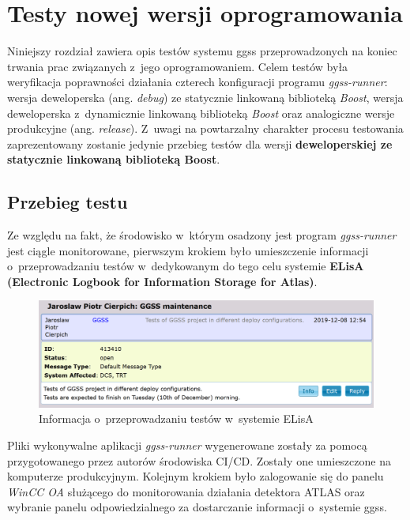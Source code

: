\chapter{Testy nowej wersji oprogramowania}
\label{cha:test}
Niniejszy rozdział zawiera opis testów systemu \gls*{ggss} przeprowadzonych na koniec trwania prac związanych z~jego oprogramowaniem. Celem testów była weryfikacja poprawności działania czterech konfiguracji programu \textit{ggss-runner}: wersja deweloperska (ang. \textit{debug}) ze statycznie linkowaną biblioteką \textit{Boost}, wersja deweloperska z~dynamicznie linkowaną biblioteką \textit{Boost} oraz analogiczne wersje produkcyjne (ang. \textit{release}). Z~uwagi na powtarzalny charakter procesu testowania zaprezentowany zostanie jedynie przebieg testów dla wersji \textbf{deweloperskiej ze statycznie linkowaną biblioteką Boost}. 

\section{Przebieg testu}
Ze względu na fakt, że środowisko w~którym osadzony jest program \textit{ggss-runner} jest ciągle monitorowane, pierwszym krokiem było umieszczenie informacji o~przeprowadzaniu testów w~dedykowanym do tego celu systemie \textbf{ELisA (Electronic Logbook for Information Storage for Atlas)}.

\begin{figure}[H]
\centering
\includegraphics[width=\textwidth]{res/png/elisa}
\caption{Informacja o~przeprowadzaniu testów w~systemie ELisA}
\label{fig:elisa}
\end{figure}

Pliki wykonywalne aplikacji \textit{ggss-runner} wygenerowane zostały za pomocą przygotowanego przez autorów środowiska CI/CD. Zostały one umieszczone na komputerze produkcyjnym. Kolejnym krokiem było zalogowanie się do panelu \textit{WinCC OA} służącego do monitorowania działania detektora ATLAS oraz wybranie panelu odpowiedzialnego za dostarczanie informacji o~systemie \gls*{ggss}. 

